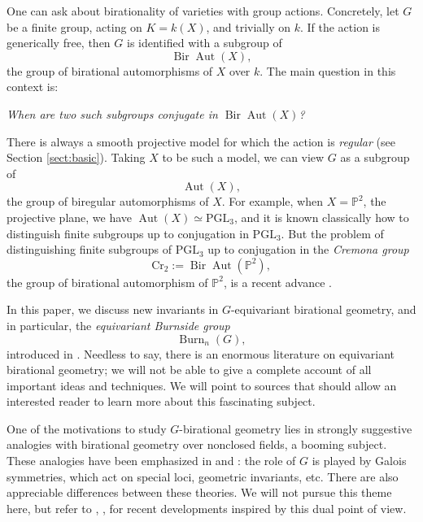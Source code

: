 \documentclass[12pt,reqno]{amsart}
\theoremstyle{plain}
\theoremstyle{remark}
\theoremstyle{definition}
\numberwithin{equation}{section}
\newcommand{\bP}{{\mathbb P}}
\newcommand{\PGL}{{\mathrm{PGL}}}
\DeclareMathOperator{\Aut}{Aut}
\DeclareMathOperator{\Burn}{Burn}
\DeclareMathOperator{\Bir}{Bir}
\begin{document}
One can ask about birationality of varieties with group actions. Concretely, let $G$ be a finite group, acting on $K=k(X)$, and trivially on $k$. If the action is generically free, then $G$ is identified with a subgroup of 
$$
\Bir\Aut(X),
$$
the group of birational automorphisms of $X$ over $k$. The main question in this context is: 

\medskip

\noindent
{\em When are two such subgroups conjugate in $\Bir\Aut(X)$?}

\medskip

There is always a smooth projective model for which the action is \emph{regular} (see Section \ref{sect:basic}).
Taking $X$ to be such a model, we can view $G$ as a subgroup of 
$$
\Aut(X),
$$
the group of biregular automorphisms of $X$. 
For example, when $X=\bP^2$, the projective plane, we have $\Aut(X)\simeq \PGL_3$, and it is known classically how to distinguish finite subgroups up to conjugation in $\PGL_3$.
But the problem of distinguishing finite subgroups of $\PGL_3$ up to conjugation in the \emph{Cremona group} 
$$
\mathrm{Cr}_2:=\Bir\Aut(\bP^2),
$$ 
the group of birational automorphism of $\bP^2$, is a recent advance \cite{CTZ-p2}.


In this paper, we discuss new 
invariants in $G$-equivariant birational 
geometry, and in particular, the 
{\em equivariant Burnside group}
$$
\Burn_n(G),
$$
introduced in \cite{BnG}. 
Needless to say, there 
is an enormous literature on equivariant birational geometry; we will not be able to give a complete account of all important ideas and techniques. We will point to sources that should allow an interested reader to learn more about this fascinating subject. 

One of the motivations to study $G$-birational geometry lies in strongly suggestive analogies with birational geometry over nonclosed fields, a booming subject. 
These analogies have been emphasized in \cite{manin} and \cite{manin2}:
the role of $G$ is played by Galois symmetries, which act on special loci, geometric invariants, etc. 
There are also appreciable differences between these theories. We will not pursue this theme here, but refer to \cite{HTtors}, \cite{HT-quad}, \cite{KT-dp} for recent developments inspired by this dual point of view. 

\medskip
\end{document}
